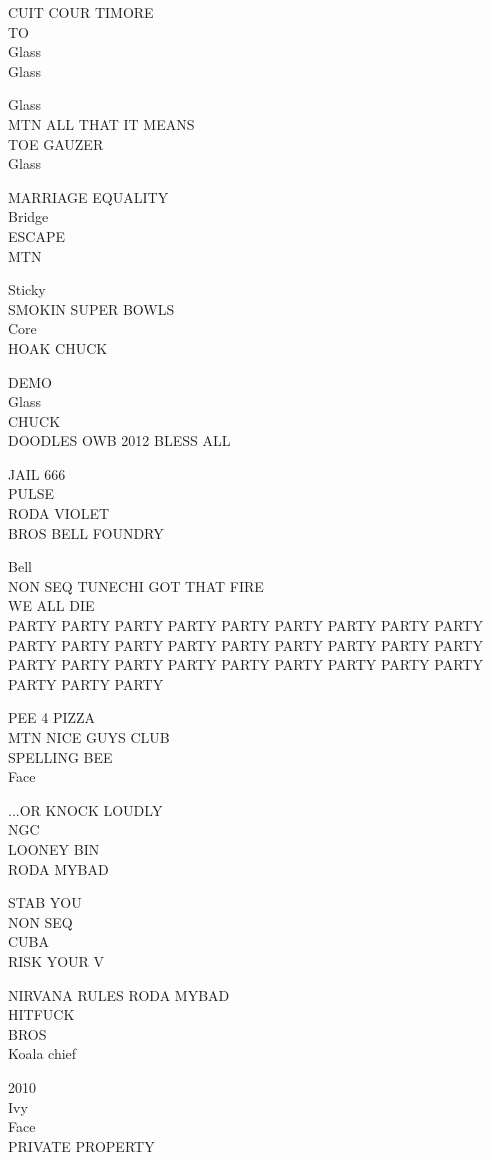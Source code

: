 \documentclass[10pt,letterpaper]{article}
\begin{document}
CUIT COUR TIMORE\\
TO\\
Glass\\
Glass

Glass\\
MTN ALL THAT IT MEANS\\
TOE GAUZER\\
Glass

MARRIAGE EQUALITY\\
Bridge\\
ESCAPE\\
MTN

Sticky\\
SMOKIN SUPER BOWLS\\
Core\\
HOAK CHUCK

DEMO\\
Glass\\
CHUCK\\
DOODLES OWB 2012 BLESS ALL

JAIL 666\\
PULSE\\
RODA VIOLET\\
BROS BELL FOUNDRY

Bell\\
NON SEQ TUNECHI GOT THAT FIRE\\
WE ALL DIE\\
PARTY PARTY PARTY PARTY PARTY PARTY PARTY PARTY PARTY PARTY PARTY PARTY PARTY PARTY PARTY PARTY PARTY PARTY PARTY PARTY PARTY PARTY PARTY PARTY PARTY PARTY PARTY PARTY PARTY PARTY

PEE 4 PIZZA\\
MTN NICE GUYS CLUB\\
SPELLING BEE\\
Face

...OR KNOCK LOUDLY\\
NGC\\
LOONEY BIN\\
RODA MYBAD

STAB YOU\\
NON SEQ\\
CUBA\\
RISK YOUR V

NIRVANA RULES RODA MYBAD\\
HITFUCK\\
BROS\\
Koala chief

2010\\
Ivy\\
Face\\
PRIVATE PROPERTY
\end{document}
